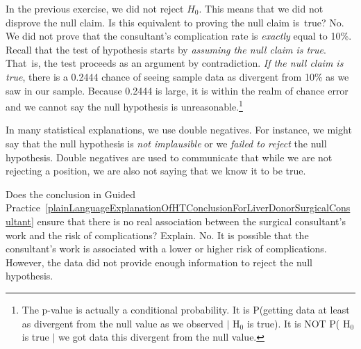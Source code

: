 \begin{example}{In the previous exercise, we did not reject $H_0$. This means that we did not disprove the null claim. Is this equivalent to proving the null claim is~true?}
No. We did not prove that the consultant's complication rate is \emph{exactly} equal to 10\%. Recall that the test of hypothesis starts by \emph{assuming the null claim is true}. That~is, the test proceeds as an argument by contradiction. \emph{If the null claim is true}, there is a 0.2444 chance of seeing sample data as divergent from 10\% as we saw in our sample. Because 0.2444 is large, it is within the realm of chance error and we cannot say the null hypothesis is unreasonable.\footnote{The p-value is actually a conditional probability. It is P(getting data at least as divergent from the null value as we observed $|$ H$_0$ is true). It is NOT P( H$_0$ is true $|$ we got data this divergent from the null value.}
\end{example}


\begin{tipBox}{
In many statistical explanations, we use double negatives. For instance, we might say that the null hypothesis is \emph{not implausible} or we \emph{failed to reject} the null hypothesis. Double negatives are used to communicate that while we are not rejecting a position, we are also not saying that we know it to be true.}
\end{tipBox}

\begin{example}{Does the conclusion in Guided Practice~\ref{plainLanguageExplanationOfHTConclusionForLiverDonorSurgicalConsultant} ensure that there is no real association between the surgical consultant's work and the risk of complications? Explain.}
No. It is possible that the consultant's work is associated with a lower or higher risk of complications. However, the data did not provide enough information to reject the null hypothesis.
\end{example}




